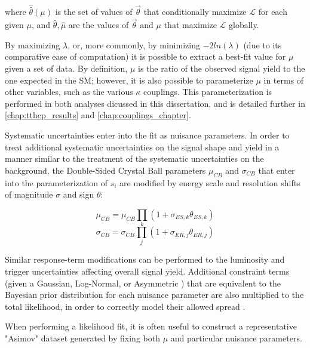 where $\hat{\hat{\theta}}(\mu)$ is the set of values of $\vec{\theta}$ that conditionally maximize $\mathcal{L}$ for each given $\mu$, and $\hat{\theta}, \hat{\mu}$ are the values of $\vec{\theta}$ and $\mu$ that maximize $\mathcal{L}$ globally.

By maximizing $\lambda$, or, more commonly, by minimizing $-2ln(\lambda)$ (due to its comparative ease of computation) it is possible to extract a best-fit value for $\mu$ given a set of data. By definition, $\mu$ is the ratio of the observed signal yield to the one expected in the SM; however, it is also possible to parameterize $\mu$ in terms of other variables, such as the various $\kappa$ couplings. This parameterization is performed in both analyses dicussed in this dissertation, and is detailed further in \ref{chap:tthcp_results} and \ref{chap:couplings_chapter}.

Systematic uncertainties enter into the fit as nuisance parameters. In order to treat additional systematic uncertainties on the signal shape and yield in a manner similar to the treatment of the systematic uncertainties on the background, the Double-Sided Crystal Ball parameters $\mu_{CB}$ and $\sigma_{CB}$ that enter into the parameterization of $s_{i}$ are modified by energy scale and resolution shifts of magnitude $\sigma$ and sign $\theta$:

\begin{equation}
\mu_{CB} = \mu_{CB} \prod_{k} (1+\sigma_{ES,k}\theta_{ES,k}) 
\end{equation}
\begin{equation}
\sigma_{CB} = \sigma_{CB} \prod_{j} (1+\sigma_{ER,j}\theta_{ER,j}) 
\end{equation}

Similar response-term modifications can be performed to the luminosity and trigger uncertainties affecting overall signal yield. Additional constraint terms (given a Gaussian, Log-Normal, or Asymmetric \cite{Cranmer}) that are equivalent to the Bayesian prior distribution for each nuisance parameter are also multiplied to the total likelihood, in order to correctly model their allowed spread \cite{JSConway}.

When performing a likelihood fit, it is often useful to construct a representative "Asimov" dataset generated by fixing both $\mu$ and particular nuisance parameters.

